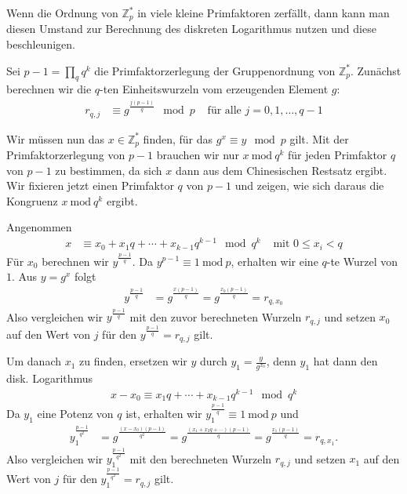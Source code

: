 \documentclass[
  a4paper,
  11pt,
]{scrartcl}
\theoremstyle{plain}
\theoremstyle{definition}
\theoremstyle{remark}
\newcommand{\Z}{\mathbb{Z}}
\newcommand{\Mod}[1]{\ \mathrm{mod}\ #1}
\begin{document}
Wenn die Ordnung von $\Z_p^*$ in viele kleine Primfaktoren zerfällt, dann kann
man diesen Umstand zur Berechnung des diskreten Logarithmus nutzen und diese
beschleunigen.

Sei $p-1 = \prod\limits_q q^k$ die Primfaktorzerlegung der Gruppenordnung von
$\Z_p^*$. Zunächst berechnen wir die $q$-ten Einheitswurzeln vom erzeugenden
Element $g$:
\begin{align*}
  r_{q, j} &
    \equiv g^{\frac{j(p-1)}{q}} \mod p &
    \text{ für alle } j = 0, 1, \ldots, q-1
\end{align*}

Wir müssen nun das $x \in \Z_p^*$ finden, für das $g^x \equiv y \mod p$ gilt.
Mit der Primfaktorzerlegung von $p-1$ brauchen wir nur $x \Mod{q^k}$ für jeden
Primfaktor $q$ von $p-1$ zu bestimmen, da sich $x$ dann aus dem Chinesischen
Restsatz ergibt. Wir fixieren jetzt einen Primfaktor $q$ von $p-1$ und zeigen,
wie sich daraus die Kongruenz $x \Mod{q^k}$ ergibt.

Angenommen
\begin{align*}
  x & \equiv x_0 + x_1 q + \cdots + x_{k-1} q^{k-1} \mod q^k
    & \text{ mit } 0 \leq x_i < q
\end{align*}
Für $x_0$ berechnen wir $y^{\frac{p-1}{q}}$. Da $y^{p-1} \equiv 1 \Mod{p}$,
erhalten wir eine $q$-te Wurzel von $1$. Aus $y = g^x$ folgt
\begin{align*}
  y^{\frac{p-1}{q}} &
    = g^{\frac{x(p-1)}{q}}
    = g^{\frac{x_0 (p-1)}{q}}
    = r_{q, x_0}
\end{align*}
Also vergleichen wir $y^{\frac{p-1}{q}}$ mit den zuvor berechneten Wurzeln
$r_{q, j}$ und setzen $x_0$ auf den Wert von $j$ für den
$y^{\frac{p-1}{q}} = r_{q, j}$ gilt.

Um danach $x_1$ zu finden, ersetzen wir $y$ durch $y_1 = \frac{y}{g^{x_0}}$,
denn $y_1$ hat dann den disk. Logarithmus
\begin{align*}
  x - x_0 \equiv x_1 q + \cdots + x_{k-1} q^{k-1} \mod q^k
\end{align*}
Da $y_1$ eine Potenz von $q$ ist, erhalten wir
$y_1^{\frac{p-1}{q}} \equiv 1 \Mod{p}$ und
\begin{align*}
  y_1^{\frac{p-1}{q^2}} &
    = g^{\frac{(x-x_0) (p-1)}{q^2}}
    = g^{\frac{(x_1 + x_2 q + \cdots) (p-1)}{q}}
    = g^{\frac{x_1 (p-1)}{q}}
    = r_{q, x_1}.
\end{align*}
Also vergleichen wir $y_1^{\frac{p-1}{q^2}}$ mit den berechneten Wurzeln
$r_{q, j}$ und setzen $x_1$ auf den Wert von $j$ für den
$y_1^{\frac{p-1}{q^2}} = r_{q, j}$ gilt.
\end{document}
